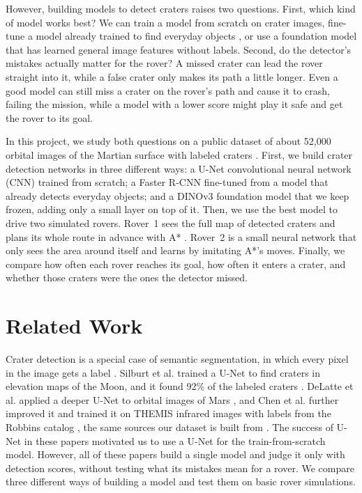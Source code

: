 \documentclass{article} %
\begin{document}
However, building models to detect craters raises two questions. First, which kind of model works best? We can train a model from scratch on crater images, fine-tune a model already trained to find everyday objects \cite{lin2014}, or use a foundation model that has learned general image features without labels. Second, do the detector's mistakes actually matter for the rover? A missed crater can lead the rover straight into it, while a false crater only makes its path a little longer. Even a good model can still miss a crater on the rover's path and cause it to crash, failing the mission, while a model with a lower score might play it safe and get the rover to its goal.

In this project, we study both questions on a public dataset of about 52,000 orbital images of the Martian surface with labeled craters \cite{hsu2021}. First, we build crater detection networks in three different ways: a U-Net convolutional neural network (CNN) \cite{ronneberger2015} trained from scratch; a Faster R-CNN \cite{ren2015} fine-tuned from a model that already detects everyday objects; and a DINOv3 \cite{simeoni2025} foundation model that we keep frozen, adding only a small layer on top of it. Then, we use the best model to drive two simulated rovers. Rover~1 sees the full map of detected craters and plans its whole route in advance with A* \cite{hart1968}. Rover~2 is a small neural network that only sees the area around itself and learns by imitating A*’s moves. Finally, we compare how often each rover reaches its goal, how often it enters a crater, and whether those craters were the ones the detector missed.


\vspace{-10pt}
\section{Related Work}
\label{sec:related_work}

Crater detection is a special case of semantic segmentation, in which every pixel in the image gets a label \cite{long2015}. Silburt et al. trained a U-Net to find craters in elevation maps of the Moon, and it found 92\% of the labeled craters \cite{silburt2019}. DeLatte et al. applied a deeper U-Net to orbital images of Mars \cite{delatte2019}, and Chen et al. further improved it and trained it on THEMIS infrared images with labels from the Robbins catalog \cite{robbins2012}, the same sources our dataset is built from \cite{chen2023}. The success of U-Net in these papers motivated us to use a U-Net for the train-from-scratch model. However, all of these papers build a single model and judge it only with detection scores, without testing what its mistakes mean for a rover. We compare three different ways of building a model and test them on basic rover simulations.
\end{document}

